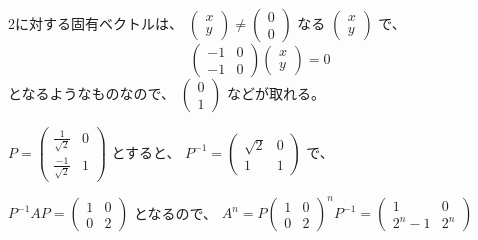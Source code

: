 \documentclass[12pt,a4]{article}
\begin{document}
2に対する固有ベクトルは、
$
\left(
\begin{array}{c}
  x \\
  y
\end{array}
\right)
\neq
\left(
\begin{array}{c}
  0 \\
  0
\end{array}
\right)
$
なる
$
\left(
\begin{array}{c}
  x \\
  y
\end{array}
\right)
$ で、
\begin{equation}
  \begin{pmatrix}
    -1 & 0 \\
    -1 & 0
  \end{pmatrix}
  \left(
  \begin{array}{c}
    x \\
    y
  \end{array}
  \right)
  = 0
\end{equation}
となるようなものなので、
$
\left(
\begin{array}{c}
  0\\
  1
\end{array}
\right)
$
などが取れる。

$ P =
\begin{pmatrix}
  \frac{1}{\sqrt{2}} & 0 \\
  \frac{-1}{\sqrt{2}} & 1
\end{pmatrix}
$
とすると、
$ P^{-1} =
\begin{pmatrix}
  \sqrt{2} & 0 \\
  1 & 1
\end{pmatrix}
$ で、

$ P^{-1} A P =
\begin{pmatrix}
  1 & 0 \\
  0 & 2
\end{pmatrix}
$ となるので、
$
A^n = P \begin{pmatrix}
  1 & 0 \\
  0 & 2
\end{pmatrix}^n P^{-1}
=
\begin{pmatrix}
  1 & 0 \\
  2^n -1 & 2^n
\end{pmatrix}
$
\end{document}
